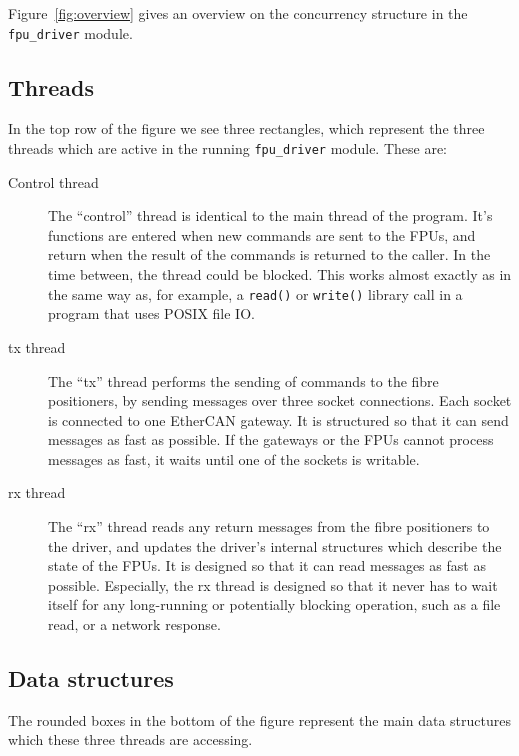 \documentclass[fontsize=12,a4paper]{scrartcl}
\begin{document}
Figure~\ref{fig:overview} gives an overview on the concurrency
structure in the \texttt{fpu\_driver} module.

\subsection{Threads}

In the top row of the figure we see three rectangles,
which represent the three threads which are active
in the running \texttt{fpu\_driver} module. These are:

\begin{description}
\item[Control thread] The ``control''  thread is identical to the main thread of
  the program. It's functions are entered when new commands are sent
  to the FPUs, and return when the result of the commands is returned
  to the caller. In the time between, the thread could be
  blocked. This works almost exactly as in the same way
  as, for example, a \texttt{read()} or \texttt{write()} library
  call in a program that uses POSIX file IO.


\item[tx thread] The ``tx'' thread performs the sending of commands to
  the fibre positioners, by sending messages over three socket
  connections. Each socket is connected to one EtherCAN gateway. It is
  structured so that it can send messages as fast as possible. If the
  gateways or the FPUs cannot process messages as fast, it waits until
  one of the sockets is writable.

\item[rx thread] The ``rx'' thread reads any return messages from the
  fibre positioners to the driver, and updates the driver's internal
  structures which describe the state of the FPUs. It is designed so
  that it can read messages as fast as possible. Especially, the rx
  thread is designed so that it never has to wait itself for any
  long-running or potentially blocking operation, such as a file read,
  or a network response.

\end{description}


\subsection{Data structures}

The rounded boxes in the bottom of the figure represent the main data
structures which these three threads are accessing.
\end{document}

